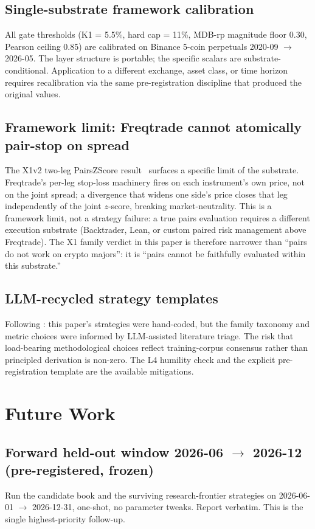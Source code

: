 \documentclass[11pt]{article}
\begin{document}
\subsection{Single-substrate framework calibration}
All gate thresholds (K1 = 5.5\%, hard cap = 11\%, MDB-rp magnitude floor
0.30, Pearson ceiling 0.85) are calibrated on Binance 5-coin perpetuals
2020-09 $\to$ 2026-05. The layer structure is portable; the specific scalars
are substrate-conditional. Application to a different exchange, asset class,
or time horizon requires recalibration via the same pre-registration
discipline that produced the original values.

\subsection{Framework limit: Freqtrade cannot atomically pair-stop on spread}
\label{sec:framework-limit}
The X1v2 two-leg PairsZScore result~\citep{result_pairs_v2} surfaces a
specific limit of the substrate. Freqtrade's per-leg stop-loss machinery
fires on each instrument's own price, not on the joint spread; a divergence
that widens one side's price closes that leg independently of the joint
$z$-score, breaking market-neutrality. This is a framework limit, not a
strategy failure: a true pairs evaluation requires a different execution
substrate (Backtrader, Lean, or custom paired risk management above
Freqtrade). The X1 family verdict in this paper is therefore narrower than
``pairs do not work on crypto majors'': it is ``pairs cannot be
faithfully evaluated within this substrate.''

\subsection{LLM-recycled strategy templates}
Following \citet{simhi2026oldhabits}: this paper's strategies were
hand-coded, but the family taxonomy and metric choices were informed by
LLM-assisted literature triage. The risk that load-bearing methodological
choices reflect training-corpus consensus rather than principled derivation
is non-zero. The L4 humility check and the explicit pre-registration
template are the available mitigations.

\section{Future Work}
\label{sec:future}

\subsection{Forward held-out window 2026-06 $\to$ 2026-12 (pre-registered, frozen)}
Run the candidate book and the surviving research-frontier strategies on
2026-06-01 $\to$ 2026-12-31, one-shot, no parameter tweaks. Report verbatim.
This is the single highest-priority follow-up.
\end{document}
